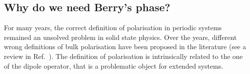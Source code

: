 \subsection{Why do we need Berry's phase?}
For many years, the correct definition of polarisation in periodic systems remained an unsolved problem in solid state physics. 
Over the years, different wrong definitions of bulk polarisation have been proposed in the literature (see a review in Ref.~\cite{restanotes}).
The definition of polarisation is intrinsically related to the one of the dipole operator, that is a problematic object for extended systems.
